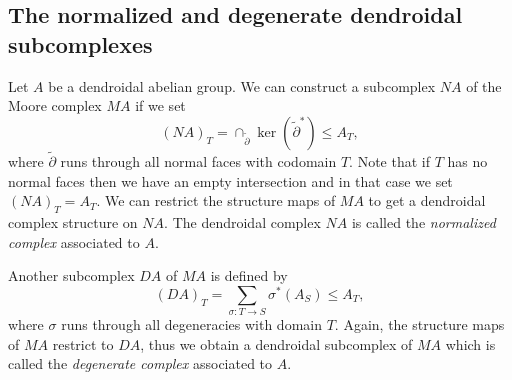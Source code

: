 \documentclass[a4paper]{amsart}
\theoremstyle{plain}
\theoremstyle{definition}
\theoremstyle{remark}
\numberwithin{equation}{section}
\numberwithin{figure}{section}
\begin{document}
\subsection{The normalized and degenerate dendroidal subcomplexes}
Let $A$ be a dendroidal abelian group. We can construct a subcomplex $NA$ of the Moore complex $MA$ if we
set
\[
(NA)_T=\cap_{\tilde\partial}\ker(\tilde\partial^*)\leq A_T,
\]
where $\tilde\partial$ runs through all normal faces with codomain
$T$. Note that if $T$ has no normal faces then we have an empty
intersection and in that case we set $(NA)_T=A_T$. We can restrict
the structure maps of $MA$ to get a dendroidal complex structure on
$NA$. The dendroidal complex $NA$ is called the \emph{normalized
complex} associated to $A$.

Another  subcomplex $DA$ of $MA$ is defined by
\[
(DA)_T=\!\!\!\!\!\sum_{\sigma\colon T\rightarrow S}\!\!\!\!\sigma^*(A_S)\leq A_T,
\]
where $\sigma$ runs through all degeneracies with domain $T$. Again, the structure maps of $MA$
restrict to $DA$, thus we obtain a dendroidal subcomplex of $MA$ which is called the \emph{degenerate
complex} associated to $A$.
\end{document}

